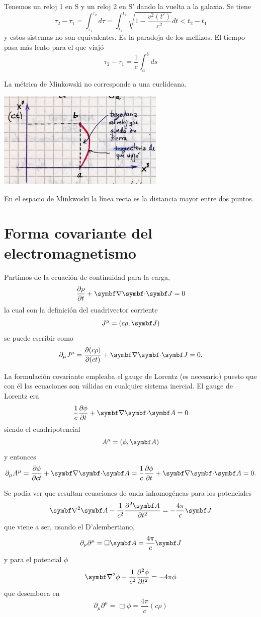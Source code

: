 \documentclass[10pt,oneside]{CBFT_book}
\begin{document}
Tenemos un reloj 1 en S y un reloj 2 en S' dando la vuelta a la galaxia.
Se tiene
\[
	\tau_2 - \tau_1 = \int_{\tau_1}^{\tau_2} d\tau = 
	\int_{t_1}^{t_2} \sqrt{ 1 - \frac{v^2(t')}{c^2}} dt < t_2 - t_1
\]
y estos sistemas no son equivalentes. Es la paradoja de los mellizos.
El tiempo pasa más lento para el que viajó
\[
	\tau_2 - \tau_1 = \frac{1}{c} \int_{a}^{b} ds
\]

La métrica de Minkowski no corresponde a una euclideana.

\includegraphics[width=0.6\textwidth]{images/fig_ft1_sperel_mellizos2.jpg}

En el espacio de Minkwoski la línea recta es la distancia mayor entre dos puntos.


\section{Forma covariante del electromagnetismo}

Partimos de la ecuación de continuidad para la carga,
\[
	\dpar{\rho}{t} + \divem{J} = 0
\]
la cual con la definición del cuadrivector corriente
\[
	J^\mu = ( c\rho , \vb{J} )
\]
se puede escribir como 
\[
	\partial_\mu J^\mu = \dpar{ (c\rho)}{(ct)} + \divem{J} = 0 .
\]

La formulación covariante empleaba el gauge de Lorentz (es necesario) puesto que con él las 
ecuaciones son válidas en cualquier sistema inercial. El gauge de Lorentz era
\[
	\frac{1}{c} \dpar{\phi}{t} + \divem{A} = 0
\]
siendo el cuadripotencial
\[
	A^\mu = ( \phi , \vb{A} ) 
\]
y entonces 
\[
	\partial_\mu A^\mu = \dpar{\phi}{ct} + \divem{A} = \frac{1}{c} \dpar{\phi}{t} + \divem{A} = 0 .
\]

Se podía ver que resultan ecuaciones de onda inhomogéneas para los potenciales
\[
	\Nabla^2 \vb{A} - \frac{1}{c^2} \dpar[2]{\vb{A}}{t} = -\frac{4\pi}{c} \vb{J}
\]
que viene a ser, usando el D'alembertiano, 
\[
	\partial_\mu\partial^\mu = \Box \vb{A} = \frac{4\pi}{c} \vb{J}
\]
y para el potencial $\phi$
\[
	\Nabla^2 \phi - \frac{1}{c^2} \dpar[2]{\phi}{t} = - 4\pi \phi
\]
que desemboca en 
\[
	\partial_\mu\partial^\mu = \Box \phi = \frac{4\pi}{c} ( c\rho )
\]
\end{document}
